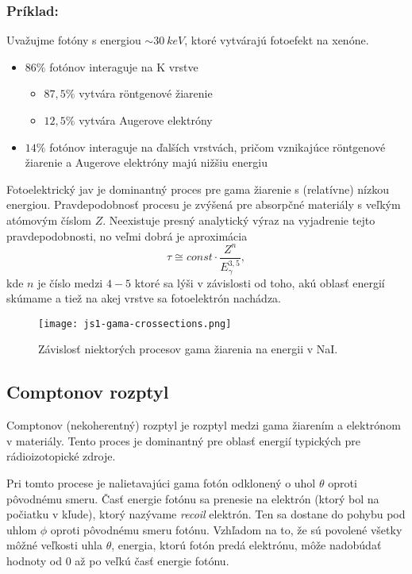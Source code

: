 \documentclass[../../main.tex]{subfiles}
\begin{document}
\subsubsection{Príklad:} Uvažujme fotóny s energiou $\sim 30\:\unit{keV}$, ktoré vytvárajú fotoefekt na xenóne. 
\begin{itemize}
\item $86\%$ fotónov interaguje na K vrstve
\begin{itemize}
\item $87,5\%$ vytvára r\"{o}ntgenové žiarenie
\item $12,5\%$ vytvára Augerove elektróny
\end{itemize}
\item $14\%$ fotónov interaguje na ďalších vrstvách, pričom vznikajúce r\"{o}ntgenové žiarenie a Augerove elektróny majú nižšiu energiu
\end{itemize}

Fotoelektrický jav je dominantný proces pre gama žiarenie s (relatívne) nízkou energiou. Pravdepodobnosť procesu je zvýšená pre absorpčné materiály s veľkým atómovým číslom $Z$. Neexistuje presný analytický výraz na vyjadrenie tejto pravdepodobnosti, no veľmi dobrá je aproximácia
\begin{equation}
\tau \cong const \cdot \dfrac{Z^n}{E_\gamma^{3,5}},
\end{equation}
kde $n$ je číslo medzi $4-5$ ktoré sa lýši v závislosti od toho, akú oblasť energií skúmame a tiež na akej vrstve sa fotoelektrón nachádza.  

\begin{figure}[h!]
\centering
\texttt{[image: js1-gama-crossections.png]}
\caption{Závislosť niektorých procesov gama žiarenia na energii v NaI.}
\label{js1:img:interakcie}
\end{figure}

\subsection{Comptonov rozptyl}

Comptonov (nekoherentný) rozptyl je rozptyl medzi gama žiarením a elektrónom v materiály. Tento proces je dominantný pre oblasť energií typických pre rádioizotopické zdroje.

Pri tomto procese je nalietavajúci gama fotón odklonený o uhol $\theta$ oproti pôvodnému smeru. Časť energie fotónu sa prenesie na elektrón (ktorý bol na počiatku v kľude), ktorý nazývame \textit{recoil} elektrón. Ten sa dostane do pohybu pod uhlom $\phi$ oproti pôvodnému smeru fotónu. Vzhľadom na to, že sú povolené všetky môžné veľkosti uhla $\theta$, energia, ktorú fotón predá elektrónu, môže nadobúdať hodnoty od $0$ až po veľkú časť energie fotónu.
\end{document}
